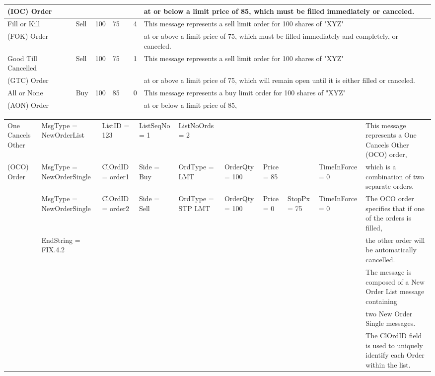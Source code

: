 \documentclass[11pt]{article}
\begin{document}
\begin{center}
\begin{tabular}{llrrrrl}
(IOC) Order &  &  &  &  &  & at or below a limit price of 85, which must be filled immediately or canceled.\\[0pt]
\hline
Fill or Kill & Sell & 100 & 75 &  & 4 & This message represents a sell limit order for 100 shares of "XYZ"\\[0pt]
(FOK) Order &  &  &  &  &  & at or above a limit price of 75, which must be filled immediately and completely, or canceled.\\[0pt]
\hline
Good Till Cancelled & Sell & 100 & 75 &  & 1 & This message represents a sell limit order for 100 shares of "XYZ"\\[0pt]
(GTC) Order &  &  &  &  &  & at or above a limit price of 75, which will remain open until it is either filled or canceled.\\[0pt]
\hline
All or None & Buy & 100 & 85 &  & 0 & This message represents a buy limit order for 100 shares of "XYZ"\\[0pt]
(AON) Order &  &  &  &  &  & at or below a limit price of 85,\\[0pt]
\hline
\end{tabular}
\end{center}

\begin{center}
\begin{tabular}{llllllllll}
One Cancels Other & MsgType   = NewOrderList & ListID  = 123 & ListSeqNo = 1 & ListNoOrds = 2 &  &  &  &  & This message represents a One Cancels Other (OCO) order,\\[0pt]
(OCO) Order & MsgType   = NewOrderSingle & ClOrdID = order1 & Side = Buy & OrdType = LMT & OrderQty = 100 & Price = 85 &  & TimeInForce = 0 & which is a combination of two separate orders.\\[0pt]
 & MsgType   = NewOrderSingle & ClOrdID = order2 & Side = Sell & OrdType = STP LMT & OrderQty = 100 & Price = 0 & StopPx = 75 & TimeInForce = 0 & The OCO order specifies that if one of the orders is filled,\\[0pt]
 & EndString = FIX.4.2 &  &  &  &  &  &  &  & the other order will be automatically cancelled.\\[0pt]
 &  &  &  &  &  &  &  &  & The message is composed of a New Order List message containing\\[0pt]
 &  &  &  &  &  &  &  &  & two New Order Single messages.\\[0pt]
 &  &  &  &  &  &  &  &  & The ClOrdID field is used to uniquely identify each Order within the list.\\[0pt]
\hline
\end{tabular}
\end{center}
\end{document}
